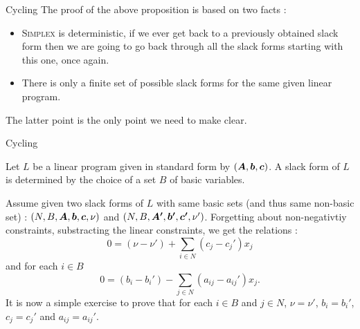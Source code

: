 \documentclass[32pt, aspectratio = 169]{beamer}
\begin{document}
    \begin{frame}{Cycling}
        The proof of the above proposition is based on two facts :
        \begin{itemize}
            \item \textsc{Simplex} is deterministic, if we ever get back to a previously obtained slack form then we are going to go back through all the slack forms starting with this one, once again.
            \item There is only a finite set of possible slack forms for the same given linear program.
        \end{itemize}
        The latter point is the only point we need to make clear.
    \end{frame}

    \begin{frame}{Cycling}
        \begin{lem}[$\bs{B}$]
            Let $L$ be a linear program given in standard form by $(\boldsymbol{A}, \boldsymbol{b}, \boldsymbol{c})$. A slack form of $L$ is determined by the choice of a set $B$ of basic variables.
        \end{lem}
        \pause
        \setlength\columnseprule{.1pt}
        \begin{multicols}{2}
            \begin{demo}
                Assume given two slack forms of $L$ with same basic sets (and thus same non-basic set) : $(N, B, \boldsymbol{A}, \boldsymbol{b}, \boldsymbol{c}, \nu)$ and $(N, B, \boldsymbol{A'}, \boldsymbol{b'}, \boldsymbol{c'}, \nu')$. \pause Forgetting about non-negativtiy constraints, substracting the linear constraints, we get the relations :
                \[
                0 = (\nu - \nu') + \sum_{i \in N} (c_j - c_j')x_j
                \]
                and for each $i \in B$
                \[
                0 = (b_i - b_i') - \sum_{j \in N} (a_{ij} - a_{ij}')x_j.
                \]
                \pause
                It is now a simple exercise to prove that for each $i \in B$ and $j \in N$, $\nu = \nu'$, $b_i = b_i'$, $c_j = c_j'$ and $a_{ij} = a_{ij}'$.
            \end{demo}
        \end{multicols}
    \end{frame}
\end{document}
